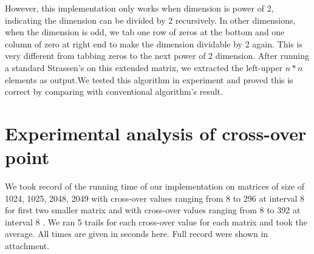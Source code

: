 \documentclass[a4paper, 11pt]{article}
\begin{document}
However, this implementation only works when dimension is power of 2, indicating the dimension can be divided by 2 recursively. In other dimensions, when the dimension is odd, we tab one row of zeros at the bottom and one column of zero at right end to make the dimension dividable by 2 again. This is very different from tabbing zeros to the next power of 2 dimension. After running a standard Strassen's on this extended matrix, we extracted the left-upper $n*n$ elements as output.We tested this algorithm in experiment and proved this is correct by comparing with conventional algorithm's result. 

\section*{Experimental analysis of cross-over point}
We took record of the running time of our implementation on matrices of size of 1024, 1025, 2048, 2049 with cross-over values ranging from 8 to 296 at interval 8 for first two smaller matrix and with cross-over values ranging from 8 to 392 at interval 8 . We ran 5 trails for each cross-over value for each matrix and took the average. All times are given in seconds here. Full record were shown in attachment.
\end{document}
